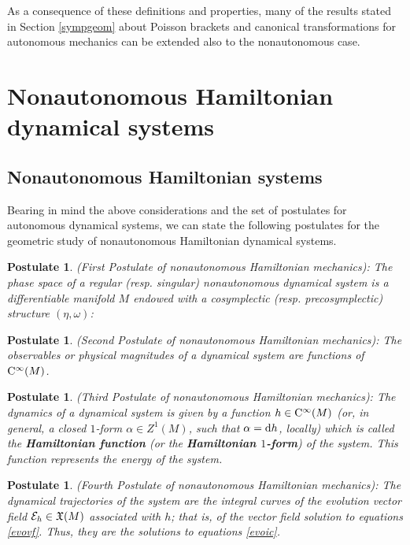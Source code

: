 \documentclass[12pt]{report}
\newtheorem{pos}[teor]{Postulate}
\def\vf{\mathfrak X}
\def\d{{\rm d}}
\def\Cinfty{{\rm C}^\infty}
\begin{document}
As a consequence of these definitions and properties,
many of the results stated in Section \ref{sympgeom}
about Poisson brackets and canonical transformations for 
autonomous mechanics can be extended also to the nonautonomous case.


\section{Nonautonomous Hamiltonian dynamical systems}


\subsection{Nonautonomous Hamiltonian systems}
\label{naspos}


Bearing in mind the above considerations and the set
of postulates for autonomous dynamical systems,
 we can state the 
following postulates for the geometric study of nonautonomous Hamiltonian dynamical systems.

\begin{pos}
{\rm (First Postulate of nonautonomous Hamiltonian mechanics\/)}:
The phase space of a regular (resp. singular)
nonautonomous dynamical system 
is a differentiable manifold $M$ endowed with a cosymplectic 
(resp. precosymplectic) structure $(\eta,\omega)$:
\label{axi1}
\end{pos}

\begin{pos}
{\rm (Second Postulate of nonautonomous  Hamiltonian mechanics\/)}:
The observables or physical magnitudes of a  dynamical  system
are functions of $\Cinfty (M)$.
\label{axi2}
\end{pos}

\begin{pos}
{\rm (Third Postulate of nonautonomous  Hamiltonian mechanics\/)}:
The dynamics of a dynamical  system
is given by a function $h\in\Cinfty(M)$
(or, in general, a closed $1$-form $\alpha \in Z^1(M)$, such that $\alpha=\d h$, locally)
which is called the \textbf{Hamiltonian function}
(or  the \textbf{Hamiltonian $1$-form}) of the system.
This function represents the energy of the system.
\end{pos}

\begin{pos}
{\rm (Fourth Postulate of nonautonomous  Hamiltonian mechanics\/)}:
The dynamical trajectories of the system are the integral curves
of the evolution vector field ${\cal E}_h\in \vf(M)$ associated with $h$;
that is, of the vector field solution to equations \eqref{evovf}.
Thus, they are the solutions to equations \eqref{evoic}.
\end{pos}
\end{document}
